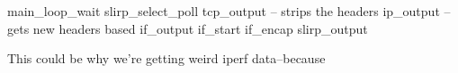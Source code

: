 \documentclass[11pt,pdftex,twocolumn]{article}
\begin{document}
main_loop_wait
slirp_select_poll
tcp_output -- strips the headers
ip_output -- gets new headers based 
if_output
if_start
if_encap
slirp_output

This could be why we're getting weird iperf data--because 








{\footnotesize 
}
\end{document}
